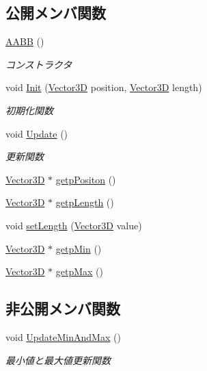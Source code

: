 \subsection*{公開メンバ関数}
\begin{DoxyCompactItemize}
\item 
\mbox{\hyperlink{class_a_a_b_b_a5f5baf6c533905aa1456b3a3eb57bab2}{A\+A\+BB}} ()
\begin{DoxyCompactList}\small\item\em コンストラクタ \end{DoxyCompactList}\item 
void \mbox{\hyperlink{class_a_a_b_b_a28167704c3b21de2ae9f70ac139781c4}{Init}} (\mbox{\hyperlink{class_vector3_d}{Vector3D}} position, \mbox{\hyperlink{class_vector3_d}{Vector3D}} length)
\begin{DoxyCompactList}\small\item\em 初期化関数 \end{DoxyCompactList}\item 
void \mbox{\hyperlink{class_a_a_b_b_a9698fec7358275832b6b84a146ea4a7c}{Update}} ()
\begin{DoxyCompactList}\small\item\em 更新関数 \end{DoxyCompactList}\item 
\mbox{\hyperlink{class_vector3_d}{Vector3D}} $\ast$ \mbox{\hyperlink{class_a_a_b_b_a8b8e043a1ccf584416d9899252f97cff}{getp\+Positon}} ()
\item 
\mbox{\hyperlink{class_vector3_d}{Vector3D}} $\ast$ \mbox{\hyperlink{class_a_a_b_b_a9e82e2bdab1dd84633dddbf8bfe561f8}{getp\+Length}} ()
\item 
void \mbox{\hyperlink{class_a_a_b_b_a76816b1eb872408d91dfa6880e5af109}{set\+Length}} (\mbox{\hyperlink{class_vector3_d}{Vector3D}} value)
\item 
\mbox{\hyperlink{class_vector3_d}{Vector3D}} $\ast$ \mbox{\hyperlink{class_a_a_b_b_ac73c1bb888074d7004abe68849f67948}{getp\+Min}} ()
\item 
\mbox{\hyperlink{class_vector3_d}{Vector3D}} $\ast$ \mbox{\hyperlink{class_a_a_b_b_ae7e52b55b90b1c6d02a8a75527d38c9e}{getp\+Max}} ()
\end{DoxyCompactItemize}
\subsection*{非公開メンバ関数}
\begin{DoxyCompactItemize}
\item 
void \mbox{\hyperlink{class_a_a_b_b_aad10f509f6726aed8285063a69df9085}{Update\+Min\+And\+Max}} ()
\begin{DoxyCompactList}\small\item\em 最小値と最大値更新関数 \end{DoxyCompactList}\end{DoxyCompactItemize}
